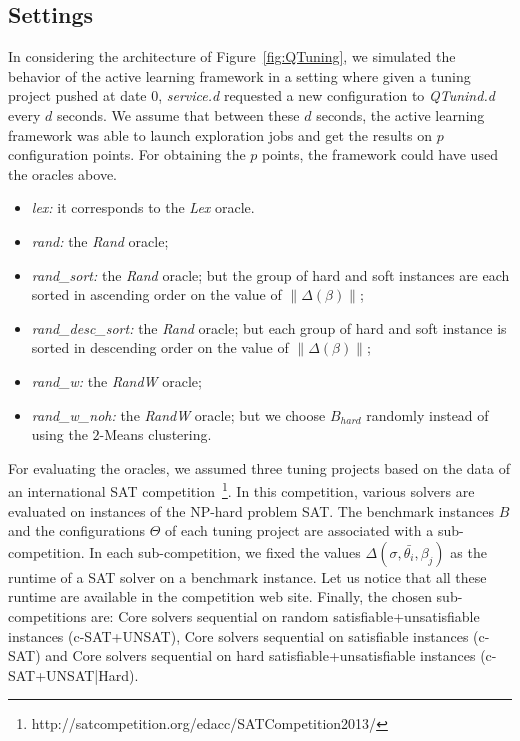 \documentclass[10pt, conference, compsocconf]{IEEEtran}
\newcommand{\norm}[1]{\left\lVert#1\right\rVert}
\begin{document}
\subsection{Settings}
In considering the architecture of Figure~\ref{fig:QTuning}, we simulated the behavior of
the active learning framework in a setting where given a tuning project pushed at date $0$,
{\it service.d} requested a new configuration to {\it QTunind.d} every $d$ seconds.
We assume that between these $d$ seconds, the active learning framework was able to launch exploration
jobs and get the results on $p$ configuration points. For obtaining the $p$ points, the framework
could have used the oracles above.
\begin{itemize}
\item {\it lex:} it corresponds to the {\it Lex} oracle.
\item {\it rand:} the {\it Rand} oracle;
\item {\it rand\_sort:} the {\it Rand} oracle; but the group of hard and soft instances are each sorted in ascending order on the value of $\norm{\Delta(\beta)}$;
\item {\it rand\_desc\_sort:} the {\it Rand} oracle; but each group of hard and soft instance is sorted in descending order on the value of $\norm{\Delta(\beta)}$;
\item {\it rand\_w:} the {\it RandW} oracle;
\item {\it rand\_w\_noh:} the {\it RandW} oracle; but we choose $B_{hard}$ randomly instead of using the $2$-Means clustering.
\end{itemize}

For evaluating the oracles, we assumed three tuning projects based on the data of an international SAT
competition~\footnote{http://satcompetition.org/edacc/SATCompetition2013/}. In this competition, various
solvers are evaluated on instances of the NP-hard problem SAT. The benchmark
instances $B$ and the configurations $\Theta$ of each tuning project are associated
with a sub-competition. In each sub-competition, we fixed the values $\Delta(\sigma, \bar{\theta_i}, \beta_j)$ as the
runtime of a SAT solver on a benchmark instance. Let us notice that all these runtime are available
in the competition web site. Finally, the chosen sub-competitions are: Core solvers sequential on random satisfiable+unsatisfiable instances (c-SAT+UNSAT), Core solvers sequential on satisfiable instances (c-SAT) and  Core solvers sequential on hard satisfiable+unsatisfiable instances (c-SAT+UNSAT|Hard).
\end{document}
